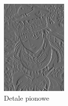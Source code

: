 \begin{figure}[ht]
\begin{minipage}[t]{0.3\linewidth}
        \includegraphics[width=\linewidth]{Rozdziały/02.Podstawy_teoretyczne/vertical_detail.png}
        \caption{Detale pionowe}
        \label{fig:image20}
    \end{minipage}
    \hspace{0.5cm}
    \begin{minipage}[t]{0.3\linewidth}

\end{minipage}
\end{figure}
